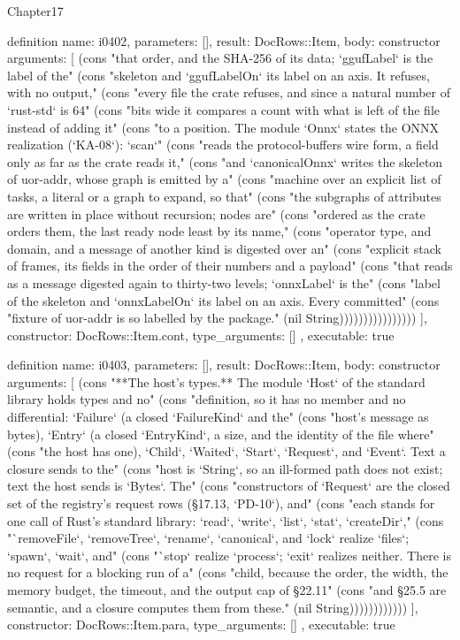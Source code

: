 \begin{lexlean}{Chapter17}
\begin{semanticmodule}
definition{
  name: i0402,
  parameters: [],
  result: DocRows::Item,
  body: constructor{
    arguments: [
      (cons "that order, and the SHA-256 of its data; `ggufLabel` is the label of the" (cons "skeleton and `ggufLabelOn` its label on an axis. It refuses, with no output," (cons "every file the crate refuses, and since a natural number of `rust-std` is 64" (cons "bits wide it compares a count with what is left of the file instead of adding it" (cons "to a position. The module `Onnx` states the ONNX realization (`KA-08`): `scan`" (cons "reads the protocol-buffers wire form, a field only as far as the crate reads it," (cons "and `canonicalOnnx` writes the skeleton of uor-addr, whose graph is emitted by a" (cons "machine over an explicit list of tasks, a literal or a graph to expand, so that" (cons "the subgraphs of attributes are written in place without recursion; nodes are" (cons "ordered as the crate orders them, the last ready node least by its name," (cons "operator type, and domain, and a message of another kind is digested over an" (cons "explicit stack of frames, its fields in the order of their numbers and a payload" (cons "that reads as a message digested again to thirty-two levels; `onnxLabel` is the" (cons "label of the skeleton and `onnxLabelOn` its label on an axis. Every committed" (cons "fixture of uor-addr is so labelled by the package." (nil String))))))))))))))))
    ],
    constructor: DocRows::Item.cont,
    type_arguments: []
  },
  executable: true
}

definition{
  name: i0403,
  parameters: [],
  result: DocRows::Item,
  body: constructor{
    arguments: [
      (cons "**The host's types.** The module `Host` of the standard library holds types and no" (cons "definition, so it has no member and no differential: `Failure` (a closed `FailureKind` and the" (cons "host's message as bytes), `Entry` (a closed `EntryKind`, a size, and the identity of the file where" (cons "the host has one), `Child`, `Waited`, `Start`, `Request`, and `Event`. Text a closure sends to the" (cons "host is `String`, so an ill-formed path does not exist; text the host sends is `Bytes`. The" (cons "constructors of `Request` are the closed set of the registry's request rows (§17.13, `PD-10`), and" (cons "each stands for one call of Rust's standard library: `read`, `write`, `list`, `stat`, `createDir`," (cons "`removeFile`, `removeTree`, `rename`, `canonical`, and `lock` realize `files`; `spawn`, `wait`, and" (cons "`stop` realize `process`; `exit` realizes neither. There is no request for a blocking run of a" (cons "child, because the order, the width, the memory budget, the timeout, and the output cap of §22.11" (cons "and §25.5 are semantic, and a closure computes them from these." (nil String))))))))))))
    ],
    constructor: DocRows::Item.para,
    type_arguments: []
  },
  executable: true
}


\end{semanticmodule}
\end{lexlean}
